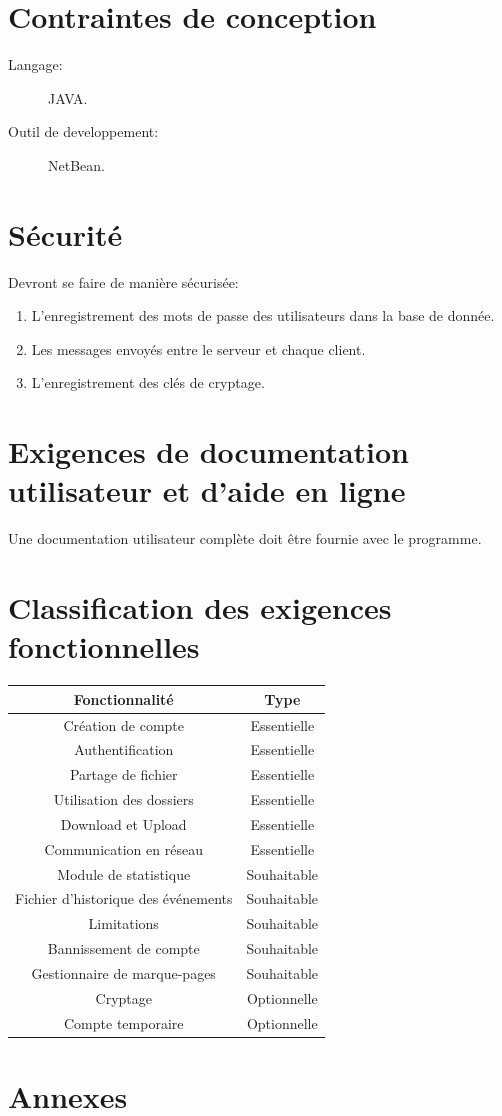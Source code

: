 \documentclass[10pt,a4paper]{report}
\begin{document}
\section{Contraintes de conception}
\begin{description}
\item[Langage:] JAVA.
\item[Outil de developpement:] NetBean.
\end{description}


\section{Sécurité}
Devront se faire de manière sécurisée:
\begin{enumerate}
\item L'enregistrement des mots de passe des utilisateurs dans la base de donnée.
\item Les messages envoyés entre le serveur et chaque client.
\item L'enregistrement des clés de cryptage.
\end{enumerate}


\section{Exigences de documentation utilisateur et d’aide en ligne}
Une documentation utilisateur complète doit être fournie avec le programme.


\section{Classification des exigences fonctionnelles}
\bgroup
\def\arraystretch{1.5}
\begin{tabular}{|c|c|}
	\hline
	{\large \textbf{Fonctionnalité}} & {\large \textbf{Type}}\\
	\hline
	Création de compte & Essentielle\\
	\hline
	Authentification & Essentielle\\
	\hline
	Partage de fichier & Essentielle \\
	\hline
	Utilisation des dossiers & Essentielle\\
	\hline
	Download et Upload & Essentielle \\
	\hline
	Communication en réseau & Essentielle \\
	\hline
	Module de statistique & Souhaitable \\
	\hline
	Fichier d'historique des événements & Souhaitable \\
	\hline
	Limitations & Souhaitable\\
	\hline
	Bannissement de compte & Souhaitable \\
	\hline
	Gestionnaire de marque-pages & Souhaitable\\
	\hline
	Cryptage & Optionnelle\\
	\hline
	Compte temporaire & Optionnelle \\
	\hline
\end{tabular}
\egroup


\section{Annexes}
\end{document}
